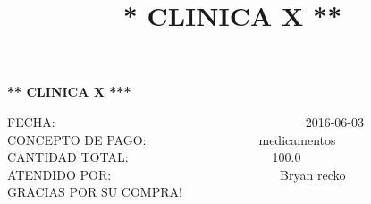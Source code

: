 \documentclass[10pt,a4paper]{letter}
\title{\bf ** CLINICA X **}
\begin{document}
\begin{center}
{\scshape\LARGE \bf *** CLINICA X ***\par}

\end{center}

FECHA:\ \ \ \ \ \ \ \ \ \ \ \ \ \ \ \ \ \ \ \ \ \ \ \ \ \ \ \ \ \ \ \ \ \ \ \ \ \ \ \ 2016-06-03 \\
CONCEPTO DE PAGO:\ \ \ \ \ \ \ \ \ \ \ \ \ \ \ \ \ \ medicamentos \\
CANTIDAD TOTAL:\ \ \ \ \ \ \ \ \ \ \ \ \ \ \ \ \ \ \ \ \ \ \ 100.0 \\
ATENDIDO POR:\ \ \ \ \ \ \ \ \ \ \ \ \ \ \ \ \ \ \ \ \ \ \ \ \ \ \ Bryan recko \\
GRACIAS POR SU COMPRA! \\ \\

 
\end{document}
